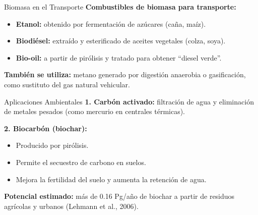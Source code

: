 \documentclass[../../main.tex]{subfiles}
\begin{document}
\begin{frame}{Biomasa en el Transporte}
\justifying
\textbf{Combustibles de biomasa para transporte:}
\begin{itemize}
  \item \textbf{Etanol:} obtenido por fermentación de azúcares (caña, maíz).
  \item \textbf{Biodiésel:} extraído y esterificado de aceites vegetales (colza, soya).
  \item \textbf{Bio-oil:} a partir de pirólisis y tratado para obtener “diesel verde”.
\end{itemize}

\vspace{0.5em}
\textbf{También se utiliza:} metano generado por digestión anaerobia o gasificación, como sustituto del gas natural vehicular.
\end{frame}

\begin{frame}{Aplicaciones Ambientales}
\justifying
\textbf{1. Carbón activado:} filtración de agua y eliminación de metales pesados (como mercurio en centrales térmicas).

\textbf{2. Biocarbón (biochar):}
\begin{itemize}
  \item Producido por pirólisis.
  \item Permite el secuestro de carbono en suelos.
  \item Mejora la fertilidad del suelo y aumenta la retención de agua.
\end{itemize}

\vspace{0.5em}
\textbf{Potencial estimado:} más de 0.16 Pg/año de biochar a partir de residuos agrícolas y urbanos (Lehmann et al., 2006).
\end{frame}


\end{document}
